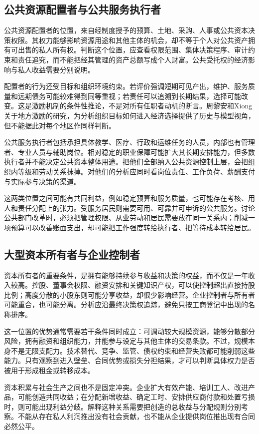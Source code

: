 \documentclass[UTF8,fontset=fandol,zihao=-4,oneside,openany]{ctexbook}
\begin{document}
\label{arg:P173}
\subsection{公共资源配置者与公共服务执行者}
公共资源配置者的位置，来自经制度授予的预算、土地、采购、人事或公共资本决策权限。其权力能够影响资源用途和其他主体的机会，却不等于个人对公共资产拥有可出售的私人所有权。判断这个位置，应查看权限范围、集体决策程序、审计约束和责任追究，而不能把经其管理的资产总额写成个人财富。公共受托权的经济影响与私人收益需要分别说明。

配置者的行为还受目标和组织环境约束。若评价强调短期可见产出，维护、服务质量和远期债务可能较难得到同等重视；若责任可以追溯到长期结果，选择可能改变。这是激励机制的条件性推论，不是对所有任职者动机的断言。周黎安和Xiong关于地方激励的研究，为分析组织目标如何进入经济选择提供了历史与模型视角，但不能据此对每个地区作同样判断。\cite{Zhou2007,Xiong2018}

公共服务执行者包括承担具体教学、医疗、行政和运维任务的人员，内部也有管理者、专业人员与辅助岗位。相对稳定的职业保障可能扩大其长期安排能力，但多数执行者并不能决定公共资本整体用途。把他们全部纳入公共资源控制上层，会把组织内等级和劳动关系抹掉。对他们的分析应同时看岗位责任、工作负荷、薪酬支付与实际参与决策的渠道。

这两类位置之间可能有共同利益，例如稳定预算和服务质量，也可能存在考核、用人和责任分配上的张力。受服务居民则需要可用、可靠并可申诉的公共服务。讨论公共部门改革时，必须把管理权限、从业劳动和居民需要放在同一关系内；削减一项预算可以改善账面支出，却可能把工作强度转给执行者、把等待成本转给居民。

\subsection{大型资本所有者与企业控制者}
资本所有者的重要条件，是拥有能够持续参与收益和决策的权益，而不仅是一年收入较高。控股、董事会权限、融资安排和关键知识产权，可以使控制超出直接持股比例；高度分散的小股东则可能分享收益，却很少影响经营。企业控制者与所有者可能重合，也可能分离。分析应沿最终决策权追踪，避免只按工商登记中出现的名称排序。

这一位置的优势通常需要若干条件同时成立：可调动较大规模资源，能够分散部分风险，拥有融资和组织能力，并能参与设定与其他主体的交易条款。不过，规模本身不是无限支配力。技术替代、竞争、监管、债权约束和经营失败都可能削弱这些能力。只有观察到进入壁垒、合同优势或损失分担结果，才可以判断具体权力是否被用于形成租金或转移成本。

资本积累与社会生产之间也不是固定冲突。企业扩大有效产能、培训工人、改进产品，可能创造共同收益；在分配新增收益、确定工时、安排供应商付款和处置亏损时，则可能出现利益分歧。解释这种关系需要把创造的总收益与分配规则分别考察。不能从存在私人利润推出没有社会贡献，也不能从企业提供岗位推出现有合同必然公平。
\end{document}
